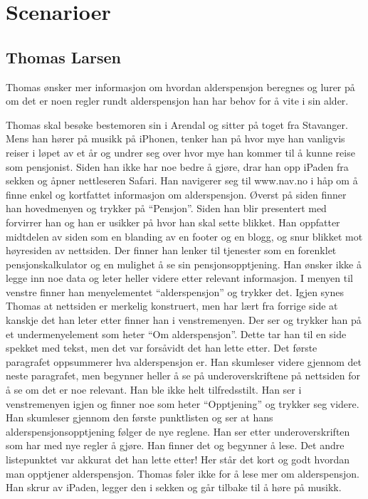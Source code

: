 \documentclass[informationsecurity]{gucmasterproject}
\begin{document}
\section{Scenarioer}
\subsection{Thomas Larsen}
Thomas ønsker mer informasjon om hvordan alderspensjon beregnes og lurer på om det er noen regler rundt alderspensjon han har behov for å vite i sin alder.

Thomas skal besøke bestemoren sin i Arendal og sitter på toget fra Stavanger. Mens han hører på musikk på iPhonen, tenker han på hvor mye han vanligvis reiser i løpet av et år og undrer seg over hvor mye han kommer til å kunne reise som pensjonist. Siden han ikke har noe bedre å gjøre, drar han opp iPaden fra sekken og åpner nettleseren Safari. Han navigerer seg til www.nav.no i håp om å finne enkel og kortfattet informasjon om alderspensjon. Øverst på siden finner han hovedmenyen og trykker på “Pensjon”. Siden han blir presentert med forvirrer han og han er usikker på hvor han skal sette blikket. Han oppfatter midtdelen av siden som en blanding av en footer og en blogg, og snur blikket mot høyresiden av nettsiden. Der finner han lenker til tjenester som en forenklet pensjonskalkulator og en mulighet å se sin pensjonsopptjening. Han ønsker ikke å legge inn noe data og leter heller videre etter relevant informasjon. I menyen til venstre finner han menyelementet “alderspensjon” og trykker det. Igjen synes Thomas at nettsiden er merkelig konstruert, men har lært fra forrige side at kanskje det han leter etter finner han i venstremenyen. Der ser og trykker han på et undermenyelement som heter “Om alderspensjon”. Dette tar han til en side spekket med tekst, men det var forsåvidt det han lette etter. Det første paragrafet oppsummerer hva alderspensjon er. Han skumleser videre gjennom det neste paragrafet, men begynner heller å se på underoverskriftene på nettsiden for å se om det er noe relevant. Han ble ikke helt tilfredsstilt. Han ser i venstremenyen igjen og finner noe som heter “Opptjening” og trykker seg videre. Han skumleser gjennom den første punktlisten og ser at hans alderspensjonsopptjening følger de nye reglene. Han ser etter underoverskriften som har med nye regler å gjøre. Han finner det og begynner å lese. Det andre listepunktet var akkurat det han lette etter! Her står det kort og godt hvordan man opptjener alderspensjon. Thomas føler ikke for å lese mer om alderspensjon. Han skrur av iPaden, legger den i sekken og går tilbake til å høre på musikk.
\end{document}
